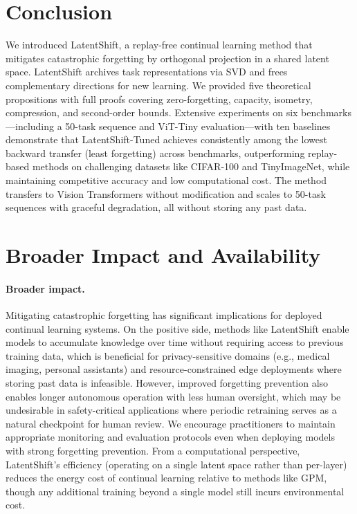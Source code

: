 \documentclass{article}
\begin{document}
\section{Conclusion}
\label{sec:conclusion}

We introduced LatentShift, a replay-free continual learning method that
mitigates catastrophic forgetting by orthogonal projection in a shared latent
space. LatentShift archives task representations via SVD and frees
complementary directions for new learning.
We provided five theoretical propositions with full proofs covering
zero-forgetting, capacity, isometry, compression, and second-order bounds.
Extensive experiments on six benchmarks---including a 50-task sequence and
ViT-Tiny evaluation---with ten baselines demonstrate that LatentShift-Tuned
achieves consistently among the lowest backward transfer (least forgetting)
across benchmarks, outperforming replay-based methods on challenging
datasets like CIFAR-100 and TinyImageNet, while
maintaining competitive accuracy and low computational cost. The method
transfers to Vision Transformers without modification and scales to 50-task
sequences with graceful degradation, all without storing any past data.

\section{Broader Impact and Availability}
\label{sec:broader_impact}

\paragraph{Broader impact.}
Mitigating catastrophic forgetting has significant implications for deployed
continual learning systems. On the positive side, methods like LatentShift
enable models to accumulate knowledge over time without requiring access to
previous training data, which is beneficial for privacy-sensitive domains
(e.g., medical imaging, personal assistants) and resource-constrained edge
deployments where storing past data is infeasible. However, improved
forgetting prevention also enables longer autonomous operation with less
human oversight, which may be undesirable in safety-critical applications
where periodic retraining serves as a natural checkpoint for human review.
We encourage practitioners to maintain appropriate monitoring and evaluation
protocols even when deploying models with strong forgetting prevention.
From a computational perspective, LatentShift's efficiency (operating on a
single latent space rather than per-layer) reduces the energy cost of
continual learning relative to methods like GPM, though any additional
training beyond a single model still incurs environmental cost.
\end{document}
